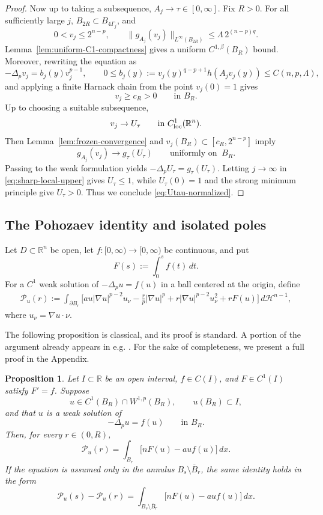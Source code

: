 \documentclass[reqno,12pt]{amsart}
\numberwithin{equation}{section}
\newtheorem{prop}[thm]{Proposition}
\theoremstyle{remark}
\newcommand{\R}{\mathbb R}
\newcommand{\dd}{\,d}
\newcommand{\Pscr}{\mathscr P}
\begin{document}
\begin{proof}
Now up to taking a subsequence, $A_j\to\tau\in[0,\infty]$.
Fix $R>0$.  For all sufficiently large $j$,
$B_{2R}\subset B_{4\Gamma_j}$, and
$$
0<v_j\le2^{n-p},\qquad 
\|g_{A_j}(v_j)\|_{L^\infty(B_{2R})} \le\Lambda\,2^{(n-p)q}.
$$
Lemma~\ref{lem:uniform-C1-compactness} gives a uniform
$C^{1,\beta}(B_R)$ bound.  Moreover, rewriting the equation as
$$
-\Delta_pv_j=b_j(y)v_j^{p-1},
\qquad 0\le b_j(y):=v_j(y)^{q-p+1}h(A_jv_j(y))\le C(n,p,\Lambda),
$$
and applying a finite Harnack chain from the point $v_j(0)=1$ gives
$$
v_j\ge c_R>0\qquad\text{in }B_R.
$$
Up to choosing a suitable subsequence,
$$
v_j\to U_\tau\qquad\text{in }C^1_{\rm loc}(\R^n).
$$
Then Lemma~\ref{lem:frozen-convergence} and
$v_j(B_R)\subset[c_R,2^{n-p}]$ imply
$$
g_{A_j}(v_j)\to g_\tau(U_\tau) \qquad\text{uniformly on }\ B_R.
$$
Passing to the weak formulation yields
$-\Delta_pU_\tau=g_\tau(U_\tau)$.
Letting $j\to\infty$ in \eqref{eq:sharp-local-upper} gives
$U_\tau\le 1$, while $U_\tau(0)=1$ and the strong minimum principle give $U_\tau>0$.
Thus  we conclude \eqref{eq:Utau-normalized}.
\end{proof}


\subsection{The Pohozaev identity and isolated  poles}\label{sec:pole}

Let $D\subset\R^n$ be open, let $f:[0,\infty)\to[0,\infty)$ be continuous, and put
$$
F(s):=\int_0^sf(t)\dd t.
$$
For a $C^1$ weak solution of $-\Delta_pu=f(u)$ in a ball centered at the origin, define
\begin{equation}\label{eq:Pohozaev-flux}
\begin{aligned}
 \Pscr_u(r):=\int_{\partial B_r}\Bigg[
 a u|\nabla u|^{p-2}u_\nu  -\frac r p|\nabla u|^p +r|\nabla u|^{p-2}u_\nu^2 +rF(u) \Bigg]\dd \mathcal H^{n-1},
\end{aligned}
\end{equation}
where $u_\nu=\nabla u\cdot\nu$.

The following proposition is classical, and its proof is standard. A portion of the argument already appears in e.g. \cite[Proposition 3.4]{QZ2026}. For the sake of completeness, we present a full proof in the Appendix.  
\begin{prop} \label{prop:local-Pohozaev}
Let $I\subset\mathbb R$ be an open interval, 
$f\in C(I)$, and $F\in C^1(I)$ satisfy $F'=f$.
Suppose
$$
u\in C^1(B_R)\cap W^{1,p}(B_R), \qquad u(B_R)\subset I,
$$
and that $u$ is a weak solution of
$$
-\Delta_pu=f(u) \qquad\text{in }B_R.
$$  
Then, for every $r\in(0,R)$,
\begin{equation}\label{eq:local-Pohozaev}
\Pscr_u(r) =\int_{B_r}\bigl[nF(u)-a u f(u)\bigr]\dd x.
\end{equation}
If the equation is assumed only in the annulus
$B_s\setminus\overline B_r$, the same identity holds in the form
\begin{equation}\label{eq:annular-Pohozaev}
\Pscr_u(s)-\Pscr_u(r) =\int_{B_s\setminus\overline B_r}
  \bigl[nF(u)-a u f(u)\bigr]\dd x.
\end{equation}
\end{prop}
\end{document}
